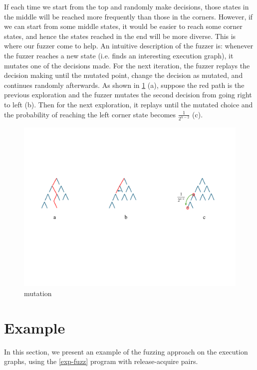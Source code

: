 If each time we start from the top and randomly make decisions, those states in the middle will be reached more frequently than those in the corners. However, if we can start from some middle states, it would be easier to reach some corner states, and hence the states reached in the end will be more diverse. This is where our fuzzer come to help. An intuitive description of the fuzzer is: whenever the fuzzer reaches a new state (i.e. finds an interesting execution graph), it mutates one of the decisions made. For the next iteration, the fuzzer replays the decision making until the mutated point, change the decision as mutated, and continues randomly afterwards. As shown in  \ref{tree3} (a), suppose the red path is the previous exploration and the fuzzer mutates the second decision from going right to left (b). Then for the next exploration, it replays until the mutated choice and the probability of reaching the left corner state becomes $\frac{1}{2^{n-2}}$ (c). 

\begin{figure}[htbp] %
    \centering
    \includegraphics[scale=0.5]{figure/tree3.pdf} %
    \caption{mutation} %
    \label{tree3} %
\end{figure}



\section{Example}

In this section, we present an example of the fuzzing approach on the execution graphs, using the \ref{exp-fuzz} program with release-acquire pairs. 


